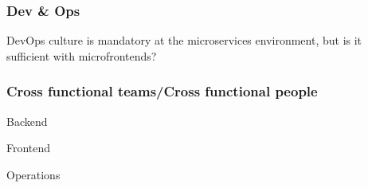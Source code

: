 \begin{frame}
\frametitle{Dev \& Ops }
DevOps culture is mandatory at the microservices environment, but is it sufficient with microfrontends?
\end{frame}


\begin{frame}
\frametitle{Cross functional teams/Cross functional people}
Backend

Frontend

Operations
\end{frame}